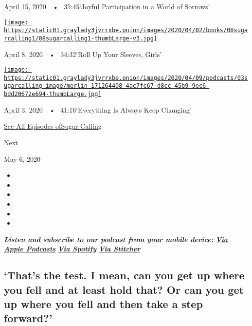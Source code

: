 April 15, 2020~~•~ 35:45`Joyful Participation in a World of Sorrows'

\href{https://www.nytimes3xbfgragh.onion/2020/04/08/podcasts/sugar-calling-margaret-atwood-coronavirus.html?action=click\&module=audio-series-bar\&region=header\&pgtype=Article}{\texttt{[image: https://static01.graylady3jvrrxbe.onion/images/2020/04/02/books/08sugarcalling1/08sugarcalling1-thumbLarge-v3.jpg]}}

April 8, 2020~~•~ 34:32`Roll Up Your Sleeves, Girls'

\href{https://www.nytimes3xbfgragh.onion/2020/04/03/podcasts/sugar-calling-george-saunders-coronavirus.html?action=click\&module=audio-series-bar\&region=header\&pgtype=Article}{\texttt{[image: https://static01.graylady3jvrrxbe.onion/images/2020/04/09/podcasts/03sugarcalling-image/merlin\_171264408\_4ac7fc67-d8cc-45b9-9ec6-bdd20672e694-thumbLarge.jpg]}}

April 3, 2020~~•~ 41:16`Everything Is Always Keep Changing'

\href{https://www.nytimes3xbfgragh.onion/column/sugar-calling}{See All
Episodes ofSugar Calling}

Next

May 6, 2020

\begin{itemize}
\item
\item
\item
\item
\item
\item
\end{itemize}

\emph{\textbf{Listen and subscribe to our podcast from your mobile
device:}}
\textbf{\href{https://podcasts.apple.com/us/podcast/sugar-calling/id1505881384}{\emph{Via
Apple Podcasts}}} \emph{\textbf{\textbar{}}}
\textbf{\href{https://open.spotify.com/show/4U8hPiNGIBvTS9zLeiDCN7?si=gRyigD47SPWl-QWgNjgt2w}{\emph{Via
Spotify}}} \emph{\textbf{\textbar{}}}
\textbf{\href{https://www.stitcher.com/podcast/the-new-york-times/sugar-calling}{\emph{Via
Stitcher}}}

\hypertarget{thats-the-test-i-mean-can-you-get-up-where-you-fell-and-at-least-hold-that-or-can-you-get-up-where-you-fell-and-then-take-a-step-forward}{%
\subsection{`That's the test. I mean, can you get up where you fell and
at least hold that? Or can you get up where you fell and then take a
step
forward?'}\label{thats-the-test-i-mean-can-you-get-up-where-you-fell-and-at-least-hold-that-or-can-you-get-up-where-you-fell-and-then-take-a-step-forward}}

